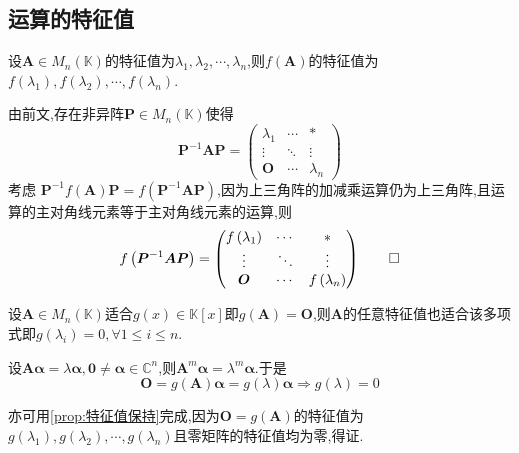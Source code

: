 \subsection{运算的特征值}
\begin{formal}
\begin{proposition}[特征值保持]\label{prop:特征值保持}
    设$\bm{A}\in M_n\left(
        \mathbb{K}
    \right)$的特征值为$\lambda_1,\lambda_2,\cdots,\lambda_n$,则$f\left(
        \bm{A}
    \right)$的特征值为$f\left(
        \lambda_1
    \right),f\left(
        \lambda_2
    \right),\cdots,f\left(
        \lambda_n
    \right)$.
\end{proposition}
\begin{Proof}
由前文,存在非异阵$\bm{P}\in M_n\left(
    \mathbb{K}
\right)$使得
\[
\bm{P}^{-1}\bm{AP}=\begin{pmatrix}
    \lambda_1&\cdots&*\\
    \vdots&\ddots&\vdots\\
    \bm{O}&\cdots&\lambda_n
\end{pmatrix}
\]考虑
$
\bm{P}^{-1}f\left(
    \bm{A}
\right)\bm{P}=f\left(
    \bm{P}^{-1}\bm{AP}
\right)
$,因为上三角阵的加减乘运算仍为上三角阵,且运算的主对角线元素等于主对角线元素的运算,则
\[
f\left(
    \bm{P}^{-1}\bm{AP}
\right)=\begin{pmatrix}
    f\left(
        \lambda_1
    \right)&\cdots&*\\
    \vdots&\ddots&\vdots\\
    \bm{O}&\cdots&f\left(
        \lambda_n
    \right)
\end{pmatrix}\qedhere
\]
\end{Proof}
\end{formal}
\begin{formal}
\begin{proposition}[多项式保持]\label{prop:多项式保持}
    设$\bm{A}\in M_n\left(
        \mathbb{K}
    \right)$适合$g\left(
        x
    \right)\in \mathbb{K}\left[x\right]$即$g\left(\bm{A}\right)=\bm{O}$,则$\bm{A}$的任意特征值也适合该多项式即$g\left(
        \lambda_i
    \right)=0,\forall 1\leqslant i\leqslant n$.
\end{proposition}
\begin{Proof}
设$\bm{A\alpha}=\lambda\bm{\alpha},\bm{0}\neq \bm{\alpha}\in \mathbb{C}^n$,则$\bm{A}^m\bm{\alpha}=\lambda^m\bm{\alpha}$.于是
\[
\bm{O}=g\left(\bm{A}\right)\bm{\alpha}=g\left(\lambda\right)\bm{\alpha}\Longrightarrow
g\left(\lambda\right)=0
\]

亦可用\cref{prop:特征值保持}完成,因为$\bm{O}=g\left(\bm{A}\right)$的特征值为$g\left(\lambda_1\right),
g\left(\lambda_2\right),\cdots,g\left(\lambda_n\right)
$且零矩阵的特征值均为零,得证.
\end{Proof}
\end{formal}
